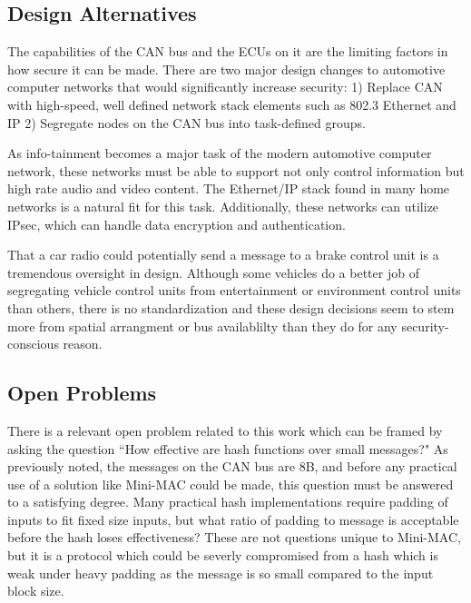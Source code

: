 \subsection{Design Alternatives}
The capabilities of the CAN bus and the ECUs on it are the limiting factors in how secure it can be made. There are two major design changes to automotive computer networks that would significantly increase security: 1) Replace CAN with high-speed, well defined network stack elements such as 802.3 Ethernet and IP 2) Segregate nodes on the CAN bus into task-defined groups.

As info-tainment becomes a major task of the modern automotive computer network, these networks must be able to support not only control information but high rate audio and video content. The Ethernet/IP stack found in many home networks is a natural fit for this task. Additionally, these networks can utilize IPsec, which can handle data encryption and authentication.

That a car radio could potentially send a message to a brake control unit is a tremendous oversight in design. Although some vehicles do a better job of segregating vehicle control units from entertainment or environment control units than others, there is no standardization and these design decisions seem to stem more from spatial arrangment or bus availablilty than they do for any security-conscious reason.


\subsection{Open Problems}
There is a relevant open problem related to this work which can be framed by asking the question ``How effective are hash functions over small messages?" As previously noted, the messages on the CAN bus are 8B, and before any practical use of a solution like Mini-MAC could be made, this question must be answered to a satisfying degree. Many practical hash implementations require padding of inputs to fit fixed size inputs, but what ratio of padding to message is acceptable before the hash loses effectiveness? These are not questions unique to Mini-MAC, but it is a protocol which could be severly compromised from a hash which is weak under heavy padding as the message is so small compared to the input block size.

